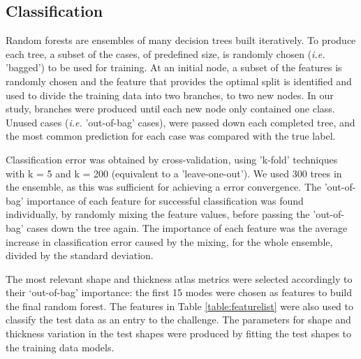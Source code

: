 \documentclass{llncs}
\begin{document}
	
	\subsection{Classification}

\label{method:classification}

 

Random forests are ensembles of many decision trees built iteratively. To produce each tree, a subset of the cases, of predefined size, is randomly chosen (\emph{i.e.} 'bagged') to be used for training. At an initial node, a subset of the features is randomly chosen and the feature that provides the optimal split is identified and used to divide the training data into two branches, to two new nodes. In our study, branches were produced until each new node only contained one class. Unused cases (\emph{i.e.} 'out-of-bag' cases), were passed down each completed tree, and the most common prediction for each case was compared with the true label.

Classification error was obtained by cross-validation, using 'k-fold' techniques with k = 5 and k = 200 (equivalent to a 'leave-one-out'). We used 300 trees in the ensemble, as this was sufficient for achieving a error convergence. The 'out-of-bag' importance of each feature for successful classification was found individually, by randomly mixing the feature values, before passing the 'out-of-bag' cases down the tree again. The importance of each feature was the average increase in classification error caused by the mixing, for the whole ensemble, divided by the standard deviation.

The most relevant shape and thickness atlas metrics were selected accordingly to their ‘out-of-bag’ importance: the first 15 modes were chosen as features to build the final random forest. The features in Table \ref{table:featurelist} were also used to classify the test data as an entry to the challenge. The parameters for shape and thickness variation in the test shapes were produced by fitting the test shapes to the training data models.
\end{document}
